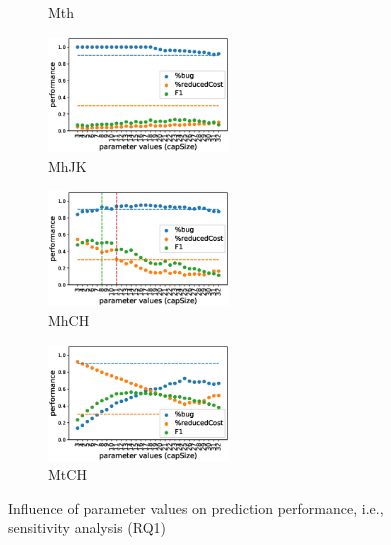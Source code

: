 \begin{figure}[t!]
\begin{subfigure}{0.24\textwidth}
	 \caption{Mth}
	 \label{fig:TLMth}
  \end{subfigure}
  \begin{subfigure}{0.24\textwidth}
    \includegraphics[width=4.8cm]{figure/threLearningMhJK.eps}
	\caption{MhJK}
   \label{fig:TLMhJK}
  \end{subfigure}
  \begin{subfigure}{0.24\textwidth}
    \includegraphics[width=4.8cm]{figure/threLearningMhCH.eps}
	\caption{MhCH}
    \label{fig:TLMhCh}
  \end{subfigure}
   \begin{subfigure}{0.24\textwidth}
    \includegraphics[width=4.8cm]{figure/threLearningMtCH.eps}
	\caption{MtCH}
    \label{fig:TLMtCh}
  \end{subfigure}
  \caption{Influence of parameter values on prediction performance, i.e., sensitivity analysis (RQ1)}
  \label{fig:thres}
\end{figure}


